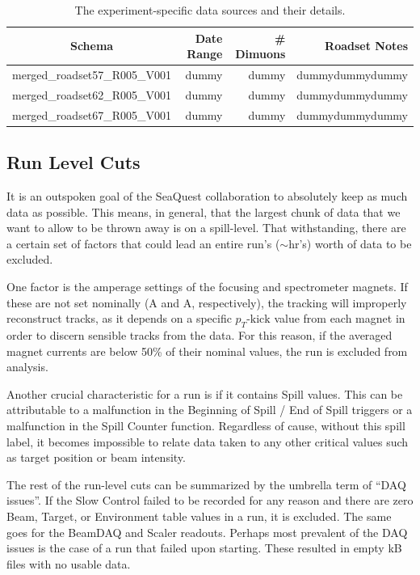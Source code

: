 \begin{table}
	\centering
	\caption{The experiment-specific data sources and their details.}
	\label{tab:roadset-stats}
	\begin{tabular}{c|rrr}
		Schema & Date Range & \# Dimuons & Roadset Notes\\	
		\hline
		merged\_roadset57\_R005\_V001 & dummy & dummy & dummydummydummy \\
		merged\_roadset62\_R005\_V001 & dummy & dummy & dummydummydummy \\
		merged\_roadset67\_R005\_V001 & dummy & dummy & dummydummydummy
	\end{tabular}
\end{table}

\subsection{Run Level Cuts}

It is an outspoken goal of the SeaQuest collaboration to absolutely keep as much data as possible. This means, in general, that the largest chunk of data that we want to allow to be thrown away is on a spill-level. That withstanding, there are a certain set of factors that could lead an entire run's ($\sim$\unit[1]{hr}'s) worth of data to be excluded.

One factor is the amperage settings of the focusing and spectrometer magnets. If these are not set nominally (\unit[2000]{A} and \unit[1600]{A}, respectively), the tracking will improperly reconstruct tracks, as it depends on a specific $p_T\text{-kick}$ value from each magnet in order to discern sensible tracks from the data. For this reason, if the averaged magnet currents are below 50\% of their nominal values, the run is excluded from analysis.

Another crucial characteristic for a run is if it contains Spill values. This can be attributable to a malfunction in the Beginning of Spill / End of Spill triggers or a malfunction in the Spill Counter function. Regardless of cause, without this spill label, it becomes impossible to relate data taken to any other critical values such as target position or beam intensity.

The rest of the run-level cuts can be summarized by the umbrella term of ``DAQ issues''. If the Slow Control failed to be recorded for any reason and there are zero Beam, Target, or Environment table values in a run, it is excluded. The same goes for the BeamDAQ and Scaler readouts. Perhaps most prevalent of the DAQ issues is the case of a run that failed upon starting. These resulted in empty \unit[32]{kB} files with no usable data.

